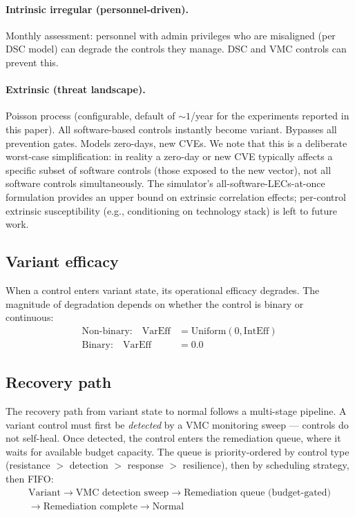 \documentclass[11pt,a4paper]{article}
\begin{document}
\paragraph{Intrinsic irregular (personnel-driven).} Monthly assessment: personnel with admin privileges who are misaligned (per DSC model) can degrade the controls they manage. DSC and VMC controls can prevent this.

\paragraph{Extrinsic (threat landscape).} Poisson process (configurable, default of ${\sim}1$/year for the experiments reported in this paper). All software-based controls instantly become variant. Bypasses all prevention gates. Models zero-days, new CVEs. We note that this is a deliberate worst-case simplification: in reality a zero-day or new CVE typically affects a specific subset of software controls (those exposed to the new vector), not all software controls simultaneously. The simulator's all-software-LECs-at-once formulation provides an upper bound on extrinsic correlation effects; per-control extrinsic susceptibility (e.g., conditioning on technology stack) is left to future work.

\subsection{Variant efficacy}

When a control enters variant state, its operational efficacy degrades. The magnitude of degradation depends on whether the control is binary or continuous:
\begin{align}
    \text{Non-binary:} \quad \mathrm{VarEff} &= \mathrm{Uniform}(0, \mathrm{IntEff}) \\
    \text{Binary:} \quad \mathrm{VarEff} &= 0.0
\end{align}

\subsection{Recovery path}

The recovery path from variant state to normal follows a multi-stage pipeline. A variant control must first be \emph{detected} by a VMC monitoring sweep --- controls do not self-heal. Once detected, the control enters the remediation queue, where it waits for available budget capacity. The queue is priority-ordered by control type (resistance $>$ detection $>$ response $>$ resilience), then by scheduling strategy, then FIFO:
\begin{multline*}
    \text{Variant} \to \text{VMC detection sweep} \to \text{Remediation queue (budget-gated)} \\
    \to \text{Remediation complete} \to \text{Normal}
\end{multline*}
\end{document}
